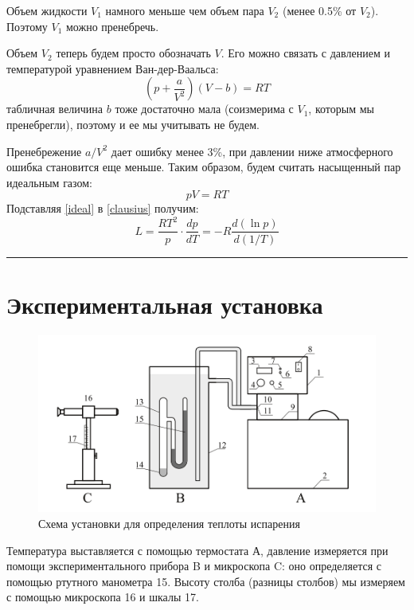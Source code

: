 \documentclass[a4paper,12pt]{report}
\begin{document}
\begin{multicols}{2}
    Объем жидкости $V_1$ намного меньше чем объем пара $V_2$ (менее 0.5\% от $V_2$). Поэтому $V_1$ можно пренебречь.

    Объем $V_2$ теперь будем просто обозначать $V$. Его можно связать с давлением и температурой уравнением Ван-дер-Ваальса:
    \begin{equation}
        \label{vdv}
        \left(p+\frac{a}{V^2}\right)(V-b)=RT
    \end{equation}
    табличная величина $b$ тоже достаточно мала (соизмерима с $V_1$, которым мы пренебрегли), поэтому и ее мы учитывать не будем.
    
    Пренебрежение $a/V^2$ дает ошибку менее 3\%, при давлении ниже атмосферного ошибка становится еще меньше. Таким образом, будем считать насыщенный пар идеальным газом:
    \begin{equation}
        \label{ideal}
        pV=RT
    \end{equation}
    Подставляя \eqref{ideal} в \eqref{clausius} получим:
    \begin{equation}
        \label{L}
        L=\frac{RT^2}{p}\cdot\frac{dp}{dT}=-R\frac{d(\ln p)}{d(1/T)}
    \end{equation}
    \end{multicols}

    \hrule

    \section{Экспериментальная установка}
    \begin{figure}[H]
        \centering
        \includegraphics[width=0.9\columnwidth]{../img/experiment.png}
        \caption{Схема установки для определения теплоты испарения}
    \end{figure}
    Температура выставляется с помощью термостата А, давление измеряется при помощи экспериментального прибора B и микроскопа C: оно определяется с помощью ртутного манометра 15. Высоту столба (разницы столбов) мы измеряем с помощью микроскопа 16 и шкалы 17. 
\end{document}
